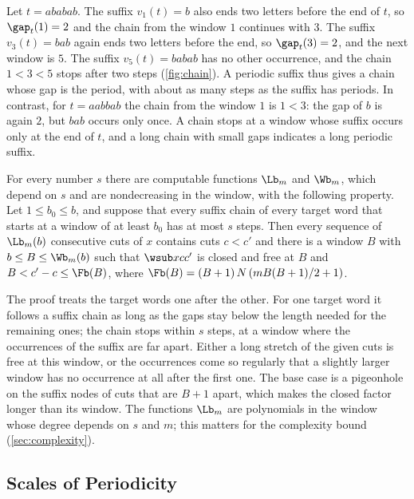 \begin{example}\label{ex:chain}
Let $t=ababab$. The suffix $v_1(t)=b$ also ends two letters before the end
of $t$, so $\gap_t(1)=2$ and the chain from the window $1$ continues with
$3$. The suffix $v_3(t)=bab$ again ends two letters before the end, so
$\gap_t(3)=2$, and the next window is $5$. The suffix $v_5(t)=babab$ has no
other occurrence, and the chain $1<3<5$ stops after two steps
(\cref{fig:chain}). A periodic suffix thus gives a chain whose gap is the
period, with about as many steps as the suffix has periods. In contrast,
for $t=aabbab$ the chain from the window $1$ is $1<3$: the gap of $b$ is
again $2$, but $bab$ occurs only once. A chain stops at a window whose
suffix occurs only at the end of $t$, and a long chain with small gaps
indicates a long periodic suffix.
\end{example}



\begin{lemma}\label{lem:closed-free}
For every number $s$ there are computable functions $\Lb_m$ and $\Wb_m$,
which depend on $s$ and are nondecreasing in the window, with the following
property. Let $1\le b_0\le b$, and suppose that every suffix chain of every
target word that starts at a window of at least $b_0$ has at most $s$
steps. Then every sequence of $\Lb_m(b)$
consecutive cuts of $x$ contains cuts $c<c'$ and there is a window $B$ with
$b\le B\le\Wb_m(b)$ such that $\wsub xc{c'}$ is closed and free at $B$ and
$B<c'-c\le\Fb(B)$, where $\Fb(B)=(B+1)\,N\,(mB(B+1)/2+1)$.
\end{lemma}

The proof treats the target words one after the other. For one target word
it follows a suffix chain as long as the gaps stay below the length needed
for the remaining ones; the chain stops within $s$ steps, at a window where the
occurrences of the suffix are far apart. Either a long stretch of the given
cuts is free at this window, or the occurrences come so regularly that a
slightly larger window has no occurrence at all after the first one. The
base case is a pigeonhole on the suffix nodes of cuts that are $B+1$ apart,
which makes the closed factor longer than its window. The functions $\Lb_m$
are polynomials in the window whose degree depends on $s$ and $m$; this
matters for the complexity bound (\cref{sec:complexity}).

\subsection{Scales of Periodicity}\label{sec:tails-levels}


